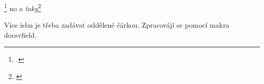 \documentclass[a4paper,10pt]{article}
\begin{document}
\footcite{small,big,kniha,koll,prispevek1} no a \emph{taky}\footnote{\cite{cs,cr,kniha2,kniha3,kap,knuth}}

Více isbn je třeba zadávat oddělené čárkou. Zpracovájí se pomocí makra docsvfield.
 
\printbibliography
\end{document}
